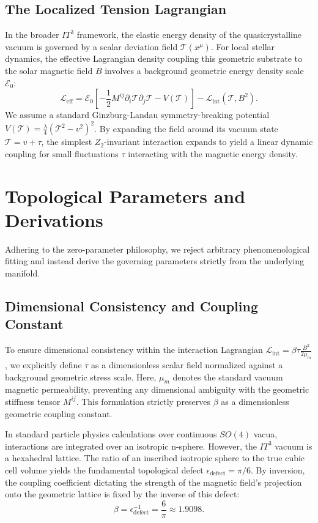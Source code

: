 \documentclass[aps, prd, onecolumn, 11pt, longbibliography, amsmath, amssymb]{revtex4-2}
\begin{document}
\subsection{The Localized Tension Lagrangian}

In the broader $IT^3$ framework, the elastic energy density of the quasicrystalline vacuum is governed by a scalar deviation field $\mathcal{T}(x^\mu)$. For local stellar dynamics, the effective Lagrangian density coupling this geometric substrate to the solar magnetic field $B$ involves a background geometric energy density scale $\mathcal{E}_0$:
\begin{equation}
\mathcal{L}_{\mathrm{eff}} = \mathcal{E}_0 \left[ -\frac{1}{2} M^{ij} \partial_i \mathcal{T} \partial_j \mathcal{T} - V(\mathcal{T}) \right] - \mathcal{L}_{\mathrm{int}}(\mathcal{T}, B^2).
\label{eq:lagrangian}
\end{equation}
We assume a standard Ginzburg-Landau symmetry-breaking potential $V(\mathcal{T}) = \frac{\lambda}{4}(\mathcal{T}^2 - v^2)^2$. By expanding the field around its vacuum state $\mathcal{T} = v + \tau$, the simplest $Z_2$-invariant interaction expands to yield a linear dynamic coupling for small fluctuations $\tau$ interacting with the magnetic energy density.

\section{Topological Parameters and Derivations}

Adhering to the zero-parameter philosophy, we reject arbitrary phenomenological fitting and instead derive the governing parameters strictly from the underlying manifold.

\subsection{Dimensional Consistency and Coupling Constant}

To ensure dimensional consistency within the interaction Lagrangian $\mathcal{L}_{\mathrm{int}} = \beta \tau \frac{B^2}{2\mu_m}$, we explicitly define $\tau$ as a dimensionless scalar field normalized against a background geometric stress scale. Here, $\mu_m$ denotes the standard vacuum magnetic permeability, preventing any dimensional ambiguity with the geometric stiffness tensor $M^{ij}$. This formulation strictly preserves $\beta$ as a dimensionless geometric coupling constant.

In standard particle physics calculations over continuous $SO(4)$ vacua, interactions are integrated over an isotropic n-sphere. However, the $IT^3$ vacuum is a hexahedral lattice. The ratio of an inscribed isotropic sphere to the true cubic cell volume yields the fundamental topological defect $\epsilon_{\mathrm{defect}} = \pi/6$. By inversion, the coupling coefficient dictating the strength of the magnetic field's projection onto the geometric lattice is fixed by the inverse of this defect:
\begin{equation}
\beta = \epsilon_{\mathrm{defect}}^{-1} = \frac{6}{\pi} \approx 1.9098.
\end{equation}
\end{document}
